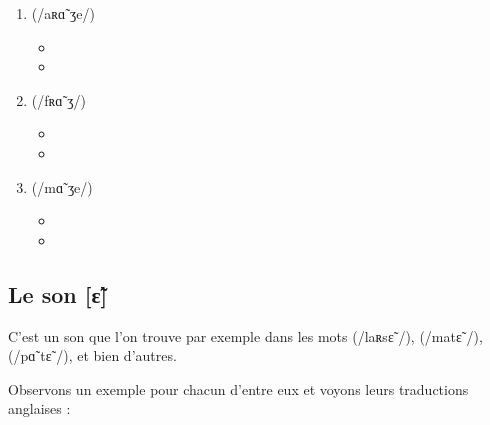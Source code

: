 \begin{enumerate}
\item {} (/aʀɑ̃ ʒe/)
  \begin{itemize}
  \item {}
    \item {}
    \end{itemize}
\item {} (/fʀɑ̃ ʒ/)
  \begin{itemize}
  \item {}
  \item {}
  \end{itemize}
\item {} (/mɑ̃ ʒe/)
  \begin{itemize}
  \item {}
  \item {}
  \end{itemize}
\end{enumerate}         

\subsection{Le son [ɛ̃]}\label{subsec:etfr}
C'est un son que l'on trouve par exemple dans les mots
 (/laʀsɛ̃ /),  (/matɛ̃ /),  (/pɑ̃ tɛ̃ /), et bien d'autres.

Observons un exemple pour chacun d'entre eux et voyons leurs
traductions anglaises :\par

